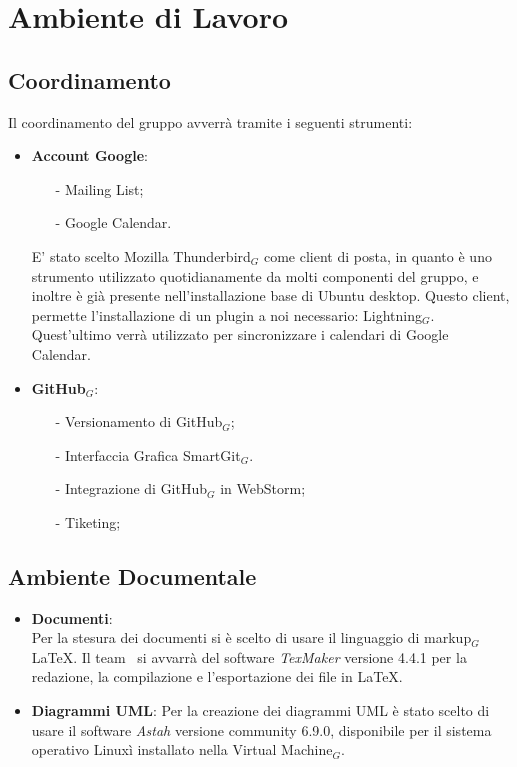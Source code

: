 \section{Ambiente di Lavoro}
\subsection{Coordinamento}
Il coordinamento del gruppo avverrà tramite i seguenti strumenti:
\begin{itemize}
	\item \textbf{Account Google}:
	\begin{itemize}
		\item[-] Mailing List;
		\item[-] Google Calendar.
	\end{itemize}
	E' stato scelto Mozilla Thunderbird$_G$ come client di posta, in quanto è uno strumento utilizzato quotidianamente da molti componenti del gruppo, e inoltre è già presente nell'installazione base di Ubuntu desktop. Questo client, permette l'installazione di un plugin a noi necessario: Lightning$_G$. Quest'ultimo verrà utilizzato per sincronizzare i calendari di Google Calendar.
	\item \textbf{GitHub$_G$}:
	\begin{itemize}
		\item[-] Versionamento di GitHub$_G$;
		\item[-] Interfaccia Grafica SmartGit$_G$.
		\item[-] Integrazione di GitHub$_G$ in WebStorm;
		\item[-] Tiketing;
	\end{itemize}
\end{itemize}
\subsection{Ambiente Documentale}
\begin{itemize}
	\item \textbf{Documenti}:\\
	Per la stesura dei documenti si è scelto di usare il linguaggio di markup$_G$ \LaTeX. Il team \gruppo\ si avvarrà del software \textit{TexMaker} versione 4.4.1 per la redazione, la compilazione e l'esportazione dei file in \LaTeX.
	\item \textbf{Diagrammi UML}:
	Per la creazione dei diagrammi UML è stato scelto di usare il software \textit{Astah} versione community 6.9.0, disponibile per il sistema operativo Linuxì installato nella Virtual Machine$_G$.
\end{itemize}
